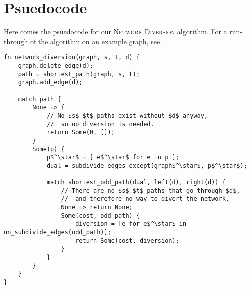 \section{Psuedocode}
Here comes the psuedocode for our \textsc{Network Diversion} algorithm. For a run-through of the algorithm on an example graph, see .

\begin{lstlisting}[caption={Main},label=Listing,mathescape=true]
fn network_diversion(graph, s, t, d) {
    graph.delete_edge(d);
    path = shortest_path(graph, s, t);
    graph.add_edge(d);

    match path {
        None => {
            // No $s$-$t$-paths exist without $d$ anyway,
            //  so no diversion is needed.
            return Some(0, []);
        }
        Some(p) {
            p$^\star$ = [ e$^\star$ for e in p ];
            dual = subdivide_edges_except(graph$^\star$, p$^\star$);

            match shortest_odd_path(dual, left(d), right(d)) {
                // There are no $s$-$t$-paths that go through $d$,
                //  and therefore no way to divert the network.
                None => return None;
                Some(cost, odd_path) {
                    diversion = [e for e$^\star$ in un_subdivide_edges(odd_path)];
                    return Some(cost, diversion);
                }
            }
        }
    }
}
\end{lstlisting}
